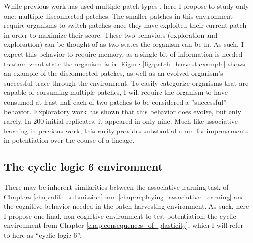 While previous work has used multiple patch types \citep{pontesEvolutionaryOriginsCognition2021}, here I propose to study only one: multiple disconnected patches.
The smaller patches in this environment require organisms to switch patches once they have exploited their current patch in order to maximize their score. 
These two behaviors (exploration and exploitation) can be thought of as two states the organism can be in.
As such, I expect this behavior to require memory, as a single bit of information is needed to store what state the organism is in. 
Figure \ref{fig:patch_harvest:example} shows an example of the disconnected patches, as well as an evolved organism's successful trace through the environment. 
To easily categorize organisms that are capable of consuming multiple patches, I will require the organism to have consumed at least half each of two patches to be considered a ''successful'' behavior. 
Exploratory work has shown that this behavior does evolve, but only rarely. 
In 200 initial replicates, it appeared in only nine. %
Much like associative learning in previous work, this rarity provides substantial room for improvements in potentiation over the course of a lineage. 

\subsection{The cyclic logic 6 environment}

There may be inherent similarities between the associative learning task of Chapters \ref{chap:alife_submission} and \ref{chap:replaying_associative_learning} and the cognitive behavior needed in the patch harvesting environment. 
As such, here I propose one final, non-cognitive environment to test potentiation: the cyclic environment from Chapter \ref{chap:consequences_of_plasticity}, which I will refer to here as ``cyclic logic 6''. 

